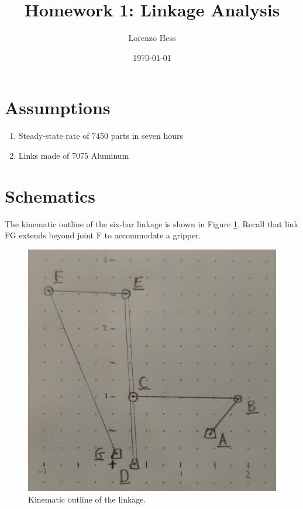 \documentclass[12pt]{article}
\author{Lorenzo Hess}
\date{\today}
\title{Homework 1: Linkage Analysis}
\let\oldToC\tableofcontents
\renewcommand{\tableofcontents}{\begin{singlespace}\oldToC\end{singlespace}}
\begin{document}
\maketitle
\tableofcontents

\section{Assumptions}%
\label{assum}

\begin{enumerate}
        \item Steady-state rate of 7450 parts in seven hours
        \item Links made of 7075 Aluminum
\end{enumerate}

\section{Schematics}%
\label{schematics}

The kinematic outline of the six-bar linkage is shown in Figure \ref{fig:kin-outline}. Recall that link FG extends beyond joint F to accommodate a gripper.

\begin{figure}[H]
  \centering
  \includegraphics[scale=0.25]{../kinematic-outline.jpeg}
  \caption{\label{fig:kin-outline}Kinematic outline of the linkage.}
\end{figure}
\end{document}
